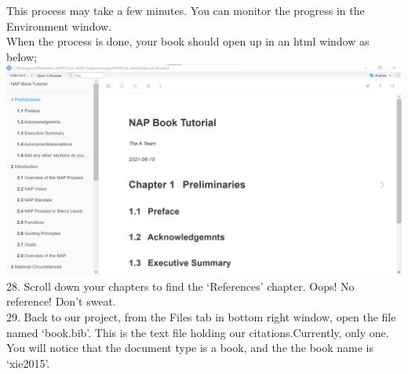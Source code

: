 \documentclass[
]{book}
\begin{document}
This process may take a few minutes. You can monitor the progress in the Environment window.\\
When the process is done, your book should open up in an html window as below;\\
\includegraphics{tutorial_screenshots/built_book.png}\\
28. Scroll down your chapters to find the `References' chapter. Oops! No reference! Don't sweat.\\
29. Back to our project, from the Files tab in bottom right window, open the file named `book.bib'. This is the text file holding our citations.Currently, only one. You will notice that the document type is a book, and the the book name is `xie2015'.
\end{document}
